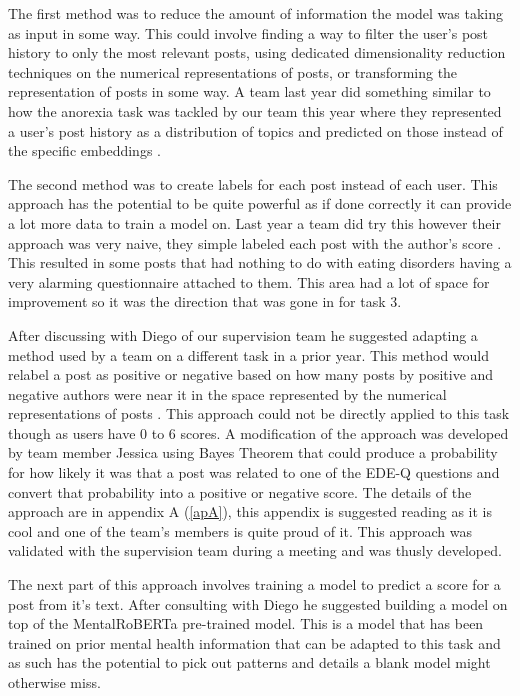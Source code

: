 \documentclass[12pt, titlepage]{article}
\begin{document}
\begin{enumerate}
The first method was to reduce the amount of information the model was taking as input in some way. This could involve finding a way to filter the user's post history to only the most relevant posts, using dedicated dimensionality reduction techniques on the numerical representations of posts, or transforming the representation of posts in some way. A team last year did something similar to how the anorexia task was tackled by our team this year where they represented a user's post history as a distribution of topics and predicted on those instead of the specific embeddings \citep{Grigore}.

The second method was to create labels for each post instead of each user. This approach has the potential to be quite powerful as if done correctly it can provide a lot more data to train a model on. Last year a team did try this however their approach was very naive, they simple labeled each post with the author's score \citep{Pan}. This resulted in some posts that had nothing to do with eating disorders having a very alarming questionnaire attached to them. This area had a lot of space for improvement so it was the direction that was gone in for task 3.

After discussing with Diego of our supervision team he suggested adapting a method used by a team on a different task in a prior year. This method would relabel a post as positive or negative based on how many posts by positive and negative authors were near it in the space represented by the numerical representations of posts \citep{Fabregat}. This approach could not be directly applied to this task though as users have 0 to 6 scores. A modification of the approach was developed by team member Jessica using Bayes Theorem that could produce a probability for how likely it was that a post was related to one of the EDE-Q questions and convert that probability into a positive or negative score. The details of the approach are in appendix A (\ref{apA}), this appendix is suggested reading as it is cool and one of the team's members is quite proud of it. This approach was validated with the supervision team during a meeting and was thusly developed.

The next part of this approach involves training a model to predict a score for a post from it's text. After consulting with Diego he suggested building a model on top of the MentalRoBERTa pre-trained model. This is a model that has been trained on prior mental health information that can be adapted to this task and as such has the potential to pick out patterns and details a blank model might otherwise miss.


\end{enumerate}
\end{document}
